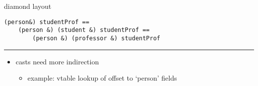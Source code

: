 \begin{frame}[fragile,label=diamLayout]{diamond layout}
\lstset{language=C++,style=small}
\begin{lstlisting}
(person&) studentProf ==
    (person &) (student &) studentProf ==
        (person &) (professor &) studentProf
\end{lstlisting}
\hrule
\begin{itemize}
\item casts need more indirection
    \begin{itemize}
    \item example: vtable lookup of offset to `person' fields
    \end{itemize}
\end{itemize}
\end{frame}
